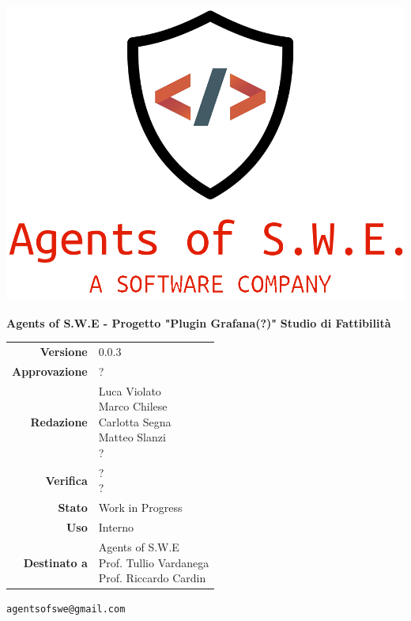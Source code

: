 


\begin{titlepage}
\thispagestyle{empty}

\begin{center}

\includegraphics[scale=0.3]{./images/logo.png} 




\large \textbf{Agents of S.W.E - Progetto "Plugin Grafana(?)"}
\vfill
\Huge \textbf{Studio di Fattibilità}
\vfill
\large
\renewcommand{\arraystretch}{1.3}
\begin{tabular}{r|l}
\textbf{Versione} & 0.0.3\\
\textbf{Approvazione} & ?\\
\textbf{Redazione} & \parbox[t]{5cm}{Luca Violato\\Marco Chilese\\Carlotta Segna\\Matteo Slanzi\\?}\\
\textbf{Verifica} & \parbox[t]{5cm}{?\\?}\\
\textbf{Stato} & Work in Progress\\
\textbf{Uso} & Interno\\
\textbf{Destinato a} & \parbox[t]{5cm}{Agents of S.W.E \\Prof. Tullio Vardanega\\Prof. Riccardo Cardin}
\end{tabular}
\vfill
\small
\texttt{agentsofswe@gmail.com}
\end{center}
\end{titlepage}

